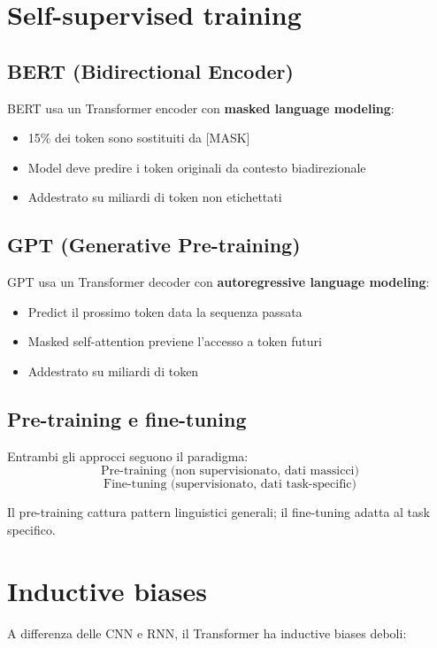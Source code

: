 \section{Self-supervised training}

\subsection{BERT (Bidirectional Encoder)}

BERT usa un Transformer encoder con \textbf{masked language modeling}:
\begin{itemize}
\item 15\% dei token sono sostituiti da [MASK]
\item Model deve predire i token originali da contesto biadi­rezionale
\item Addestrato su miliardi di token non etichettati
\end{itemize}

\subsection{GPT (Generative Pre-training)}

GPT usa un Transformer decoder con \textbf{autoregressive language modeling}:
\begin{itemize}
\item Predict il prossimo token data la sequenza passata
\item Masked self-attention previene l'accesso a token futuri
\item Addestrato su miliardi di token
\end{itemize}

\subsection{Pre-training e fine-tuning}

Entrambi gli approcci seguono il paradigma:
\[
\text{Pre-training (non supervisionato, dati massicci)}
\]
\[
\text{Fine-tuning (supervisionato, dati task-specific)}
\]

Il pre-training cattura pattern linguistici generali; il fine-tuning adatta al task specifico.

\section{Inductive biases}

A differenza delle CNN e RNN, il Transformer ha inductive biases deboli:

